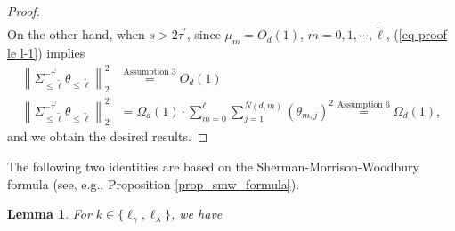 \documentclass{article}
\theoremstyle{plain}
\newtheorem{lemma}[theorem]{Lemma}
\theoremstyle{definition}
\theoremstyle{remark}
\newcommand{\green}{\color{green}}
\begin{document}
\begin{appendix}
\begin{proof}
\begin{equation*}
\begin{aligned}
\end{aligned}
    \end{equation*}
On the other hand, when $s > 2\tau^{\prime}$,
since $\mu_m = O_d(1)$, $m=0, 1, \cdots, \tilde{\ell}$, (\ref{eq proof le l-1}) implies
\begin{equation*}
\begin{aligned}
    \left\| \Sigma_{\leq \tilde{\ell}}^{-\tau^{\prime}}  \theta_{\leq \tilde{\ell}} \right\|_{2}^{2} &\overset{\text{Assumption } 3}{=} 
    O_{d} \left( 1 \right)\\
        \left\| \Sigma_{\leq \tilde{\ell}}^{-\tau^{\prime}}  \theta_{\leq \tilde{\ell}} \right\|_{2}^{2} &= 
        \Omega_d(1) \cdot \sum\limits_{m = 0}^{\tilde{\ell}}  \sum\limits_{j = 1 }^{N(d, m)} (\theta_{m,j})^{2}
        \overset{\text{Assumption } 6}{=}
        \Omega_d(1),
\end{aligned}
    \end{equation*}
and we obtain the desired results.
\end{proof}




The following two identities are based on the Sherman-Morrison-Woodbury formula (see, e.g., Proposition \ref{prop_smw_formula}).




\begin{lemma}\label{lemma trans in V2}
For $k \in \{\ell_{\gamma}, \ell_{\lambda}\}$, we have


\end{lemma}
\end{appendix}
\end{document}
